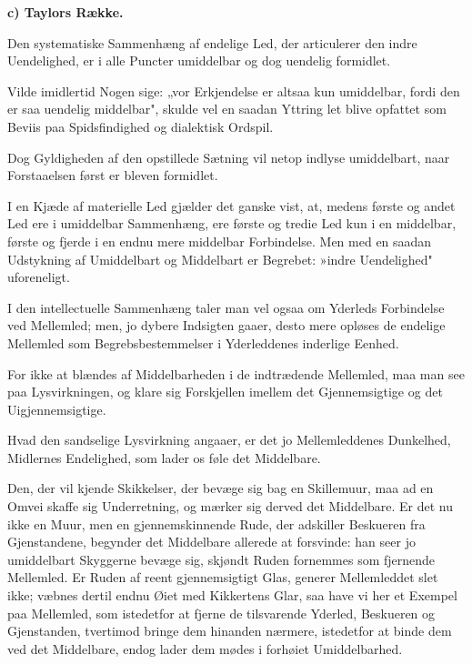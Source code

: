 \documentclass[12pt]{book}
\newcommand{\opage}[1]{\marginnote{\footnotesize\textit{[#1]}}}
\begin{document}
\begin{center}
\textbf{c) Taylors Række.}
\end{center}
{}

Den systematiske Sammenhæng af endelige Led, der articulerer den indre
Uendelighed, er i alle Puncter umiddelbar og dog uendelig formidlet.

Vilde imidlertid Nogen sige: „vor Erkjendelse er altsaa kun umiddelbar, fordi den
er saa uendelig middelbar", skulde vel en saadan Yttring let blive opfattet som
Beviis paa Spidsfindighed og dialektisk Ordspil.

Dog Gyldigheden af den opstillede Sætning vil netop indlyse umiddelbart, naar
Forstaaelsen først er bleven formidlet.

I en Kjæde af materielle Led gjælder det ganske vist, at, medens første og andet
Led ere i umiddelbar Sammenhæng, ere første og tredie Led kun i en middelbar,
første og fjerde i en endnu mere middelbar Forbindelse. Men med en saadan
Udstykning af Umiddelbart og Middelbart er Begrebet: »indre Uendelighed"
uforeneligt.

I den intellectuelle Sammenhæng taler man vel ogsaa om Yderleds Forbindelse ved
Mellemled; men, jo dybere Indsigten gaaer, desto mere opløses de endelige
Mellemled som Begrebsbestemmelser i Yderleddenes inderlige Eenhed.

For ikke at blændes af Middelbarheden i de indtrædende Mellemled, maa man see paa
Lysvirkningen, og klare sig Forskjellen imellem det Gjennemsigtige og det
Uigjennemsigtige.

\opage{42} Hvad den sandselige Lysvirkning angaaer, er det jo Mellemleddenes Dunkelhed,
Midlernes Endelighed, som lader os føle det Middelbare.

Den, der vil kjende Skikkelser, der bevæge sig bag en Skillemuur, maa ad en Omvei
skaffe sig Underretning, og mærker sig derved det Middelbare. Er det nu ikke en
Muur, men en gjennemskinnende Rude, der adskiller Beskueren fra Gjenstandene,
begynder det Middelbare allerede at forsvinde: han seer jo umiddelbart Skyggerne
bevæge sig, skjøndt Ruden fornemmes som fjernende Mellemled. Er Ruden af reent
gjennemsigtigt Glas, generer Mellemleddet slet ikke; væbnes dertil endnu Øiet med
Kikkertens Glar, saa have vi her et Exempel paa Mellemled, som istedetfor at
fjerne de tilsvarende Yderled, Beskueren og Gjenstanden, tvertimod bringe dem
hinanden nærmere, istedetfor at binde dem ved det Middelbare, endog lader dem
mødes i forhøiet Umiddelbarhed.
\end{document}
